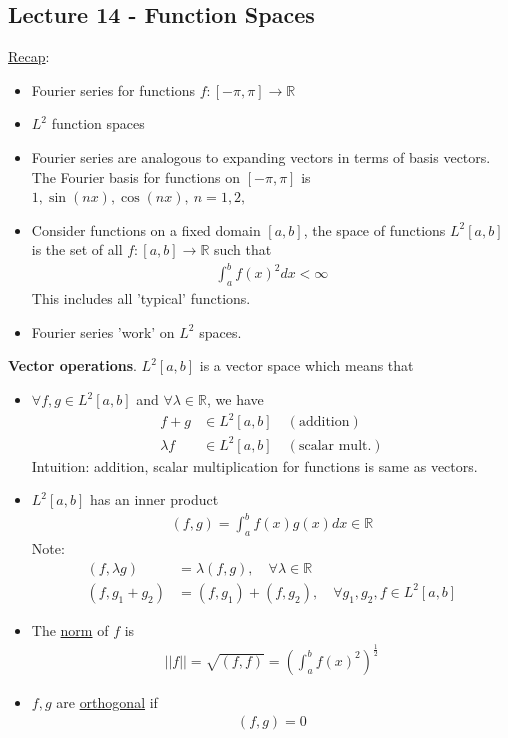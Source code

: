\documentclass[12pt, letterpaper]{article}
\begin{document}
\subsection{Lecture 14 - Function Spaces}
\underline{Recap}:
\begin{itemize}
    \item Fourier series for functions $f:[-\pi,\pi] \rightarrow \mathbb{R}$
    \item $L^2$ function spaces
    \item Fourier series are analogous to expanding vectors in terms of basis vectors.
    The Fourier basis for functions on $[-\pi,\pi]$ is $1,\sin(nx),\cos(nx),\ n = 1,2,$
    \item Consider functions on a fixed domain $[a,b]$, the space of functions $L^2[a,b]$
    is the set of all $f:[a,b]\rightarrow\mathbb{R}$ such that 
    \begin{align*}
        \int_{a}^{b}f(x)^2dx < \infty
    \end{align*}
    This includes all 'typical' functions.
    \item Fourier series 'work' on $L^2$ spaces.
\end{itemize}
\textbf{Vector operations}. $L^2[a,b]$ is a vector space which means that
\begin{itemize}
    \item $\forall f,g \in L^2[a,b]$ and 
    $\forall\lambda \in \mathbb{R}$, we have 
    \begin{align*}
       f+g &\in L^2[a,b]\quad (\text{addition}) \\
        \lambda f &\in L^2[a,b]\quad (\text{scalar mult.})
    \end{align*}
    Intuition: addition, scalar multiplication for functions is same as vectors.
    \item $L^2[a,b]$ has an inner product
    \begin{align*}
        (f,g) = \int_{a}^{b}f(x)g(x)dx \in \mathbb{R}
    \end{align*}
    Note:
    \begin{align*}
        (f,\lambda g) &= \lambda(f,g),\quad \forall \lambda \in \mathbb{R} \\
        (f,g_1+g_2) &= (f,g_1) + (f,g_2),\quad \forall g_1,g_2,f \in L^2[a,b]
    \end{align*}
    \item The \underline{norm} of $f$ is 
    \begin{align*}
        ||f|| = \sqrt{(f,f)} = \left(\int_{a}^{b}f(x)^2\right)^\frac{1}{2}
    \end{align*}
    \item $f,g$ are \underline{orthogonal} if 
    \begin{align*}
        (f,g) = 0
    \end{align*}
\end{itemize}
\end{document}
